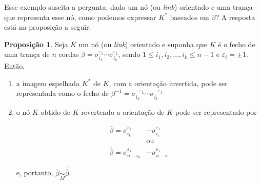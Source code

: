 \documentclass[a4paper,portuguese,11pt,twoside, leqno]{book}
\theoremstyle{definition}
\newtheorem{prop}{Proposição}[section]
\begin{document}
	\par\vspace{0.3cm} Esse exemplo suscita a pergunta: dado um nó (ou \textit{link}) orientado e uma trança que representa esse nó, como podemos expressar $K^\ast$ baseados em $\beta$? A resposta está na proposição a seguir.
	
	\begin{prop}
		\label{representacao no espelhado}
		Seja $K$ um nó (ou \textit{link}) orientado e suponha que $K$ é o fecho de uma trança de $n$ cordas $\beta = \sigma_{i_1}^{\varepsilon_1}\cdots\sigma_{i_k}^{\varepsilon_k}$, sendo $1\leq i_1, i_2, \dots, i_k\leq n-1$ e $\varepsilon_i=\pm1$. Então, 
		\begin{enumerate}
			\item a imagem espelhada $K^\ast$ de $K$, com a orientação invertida, pode ser representada como o fecho de 
			$\beta^{-1}  = \sigma_{i_k}^{-\varepsilon_{k}}\cdots\sigma_{i_1}^{-\varepsilon_1}$ 
			\item o nó $\overline{K}$ obtido de $K$ revertendo a orientação de $K$ pode ser representado por
			
			\begin{align*}
			\overline{\beta} = \sigma_{i_k}^{\varepsilon_k}&\cdots\sigma_{i_i}^{\varepsilon_1} \\
			&\text{ou} \\
			\overline{\overline{\beta}} = \sigma_{n-i_k}^{\varepsilon_k}&\cdots\sigma_{n - i_1}^{\varepsilon_1}
			\end{align*}
			\par\vspace{0.3cm} e, portanto, $\overline{\beta}\underset{M}{\sim}\overline{\overline{\beta}}$. 
		\end{enumerate}
	\end{prop}
	
\end{document}
